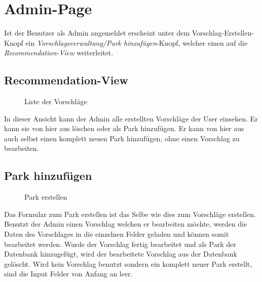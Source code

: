 \section{Admin-Page}
\label{adminpage}


Ist der Benutzer als Admin angemeldet erscheint unter dem Vorschlag-Erstellen-Knopf ein 
\textit{Vorschlagsverwaltung/Park hinzufügen}-Knopf, welcher einen auf die \textit{Recommendation-View}
weiterleitet. 


\subsection{Recommendation-View}

\begin{figure}[H]
    \begin{center}
      \caption{Liste der Vorschläge}
    \end{center}
\end{figure}

In dieser Ansicht kann der Admin alle erstellten Vorschläge der User einsehen. Er kann sie von hier 
aus löschen oder als Park hinzufügen. Er kann von hier aus auch selbst einen komplett neuen
Park hinzufügen, ohne einen Vorschlag zu bearbeiten.

\subsection{Park hinzufügen}

\begin{figure}[H]
    \begin{center}
      \caption{Park erstellen}
    \end{center}
\end{figure}

Das Formular zum Park erstellen ist das Selbe wie dies zum Vorschläge erstellen. Benutzt der Admin einen 
Vorschlag welchen er bearbeiten möchte, werden die Daten des Vorschlages in die einzelnen Felder 
geladen und können somit bearbeitet werden. Wurde der Vorschlag fertig bearbeitet und als Park der 
Datenbank hinzugefügt, wird der bearbeitete Vorschlag aus der Datenbank gelöscht. 
Wird kein Vorschlag benutzt sondern ein komplett neuer Park erstellt, sind die Input Felder von Anfang 
an leer.
